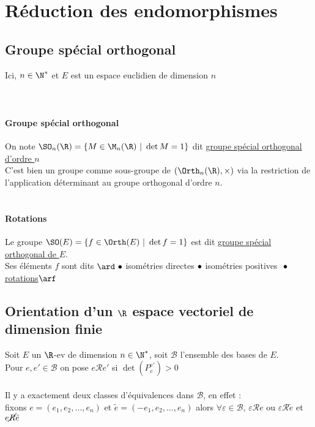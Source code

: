 	\section{Réduction des endomorphismes}
	\subsection{Groupe spécial orthogonal}
		Ici, $n\in\N^*$ et $E$ est un espace euclidien de dimension $n$
		\vspace*{0.5cm} \\ 
		\vspace*{0.5cm} \\ 
		\\ \traitd
		\paragraph{Groupe spécial orthogonal}
			On note $\SO_n(\R) = \{ M\in\M_n(\R) ~|~\det M = 1\}$ dit \uline{groupe spécial orthogonal d'ordre $n$} \trait
		\vspace*{-1.1cm} \\ C'est bien un groupe comme sous-groupe de $(\Orth_n(\R),\times)$ via la restriction de l'application déterminant au groupe orthogonal d'ordre $n$.
		\vspace*{0.5cm} \\ 
		\\ \traitd
		\paragraph{Rotations}
			Le groupe $\SO(E) =\{ f\in\Orth(E) ~|~ \det f =1 \}$ est dit \uline{groupe spécial orthogonal de $E$}.\\
			Ses éléments $f$ sont dits $ \ard ~\bullet$ isométries directes$\\~\bullet$ isométries positives $\\~\bullet$ \uline{rotations}$\arf$\vspace*{0.25cm}\trait
	\subsection{Orientation d'un $\R$ espace vectoriel de dimension finie}
		Soit $E$ un $\R$-ev de dimension $n\in\N^*$, soit $\mathcal{B}$ l'ensemble des bases de $E$.\\
		Pour $e,e'\in\mathcal{B}$ on pose $e\mathcal{R} e'$ si $\det (P_e^{e'})>0$
		\vspace*{0.5cm} \\ 
		\\ Il y a exactement deux classes d'équivalences dans $\mathcal{B}$, en effet :\\
		fixons $e=(e_1,e_2,\dots ,e_n)$ et $\tilde{e}=(-e_1,e_2,\dots ,e_n)$ alors 
		$\forall \varepsilon\in\mathcal{B}$, $\varepsilon\mathcal{R} e$ ou $\varepsilon\mathcal{R} \tilde{e}$ et $e\mathcal{\cancel{R}} \tilde{e}$\\\traitd
